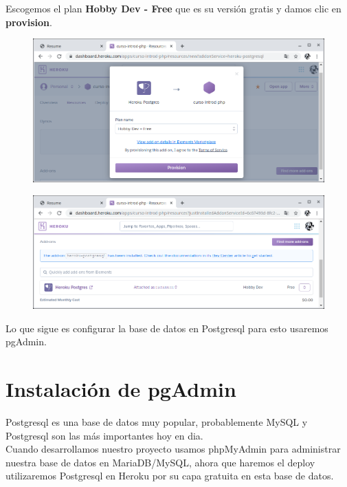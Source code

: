 \documentclass{article}
\begin{document}
Escogemos el plan \textbf{Hobby Dev - Free} que es su versión gratis y damos
clic en \textbf{provision}.\\

\begin{figure}[h!]
  \centering
  \includegraphics[scale=0.5]{./Pictures/257_hobby_dev.png}
\end{figure}

\begin{figure}[h!]
  \centering
  \includegraphics[scale=0.5]{./Pictures/258_addon_installed.png}
\end{figure}

Lo que sigue es configurar la base de datos en Postgresql para esto usaremos
pgAdmin.\\


\section{Instalación de pgAdmin}%
Postgresql es una base de datos muy popular, probablemente MySQL y Postgresql
son las más importantes hoy en dia.\\

Cuando desarrollamos nuestro proyecto usamos phpMyAdmin para administrar
nuestra base de datos en MariaDB/MySQL, ahora que haremos el deploy
utilizaremos Postgresql en Heroku por su capa gratuita en esta base de datos.\\
\end{document}
